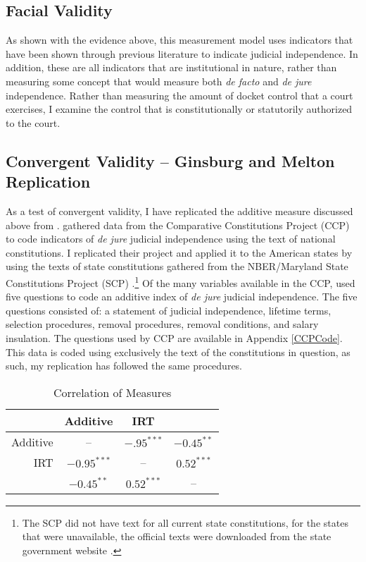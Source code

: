 \documentclass[JohnsonMADraft3.tex]{subfiles}
\begin{document}
\doublespacing

\subsection{Facial Validity}
As shown with the evidence above, this measurement model uses indicators that have been shown through previous literature to indicate judicial independence. In addition, these are all indicators that are institutional in nature, rather than measuring some concept that would measure both \textit{de facto} and \textit{de jure} independence. Rather than measuring the amount of docket control that a court exercises, I examine the control that is constitutionally or statutorily authorized to the court.


\subsection{Convergent Validity -- Ginsburg and Melton Replication}
As a test of convergent validity, I have replicated the additive measure discussed above from \citet{Melton2014}.  \citet{Melton2014} gathered data from the Comparative Constitutions Project (CCP) to code indicators of \textit{de jure} judicial independence using the text of national constitutions.  I replicated their project and applied it to the American states by using the texts of state constitutions gathered from the NBER/Maryland State Constitutions Project (SCP) \citep{Wallisnber}.\footnote{The SCP did not have text for all current state constitutions, for the states that were unavailable, the official texts were downloaded from the state government website \citep{Wallisnber}.}  Of the many variables available in the CCP, \citet{Melton2014} used five questions to code an additive index of \textit{de jure} judicial independence.  The five questions consisted of: a statement of judicial independence, lifetime terms, selection procedures, removal procedures, removal conditions, and salary insulation.  The questions used by CCP are available in Appendix \ref{CCPCode}.  This data is coded using exclusively the text of the constitutions in question, as such, my replication has followed the same procedures.

\begin{table}[ht]
	\centering\caption{Correlation of Measures}\label{Correlation}
	\begin{tabular}{rccc}
		\hline
		& Additive & IRT & \citeauthor{Melton2014} \\ 
		\hline
		Additive & -- & $-.95^{***}$ &$-0.45^{**}$ \\ 
		IRT & $-0.95^{***}$ & -- & $0.52^{***}$ \\ 
		\citeauthor{Melton2014} & $-0.45^{**}$  &  $0.52^{***}$ & --\\ 
		\hline
	\end{tabular}
\end{table}
\end{document}
